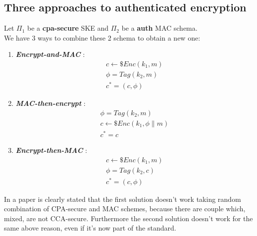 \subsection{Three approaches to authenticated encryption}
Let $\Pi_{1}$ be a \textbf{cpa-secure} SKE and $\Pi_{2}$ be a \textbf{auth} MAC
schema.\\
We have 3 ways to combine these 2 schema to obtain a new one:
\begin{enumerate}
    \item \textbf{ \textit{Encrypt-and-MAC} } :
        \begin{gather*}
            c \leftarrow\$ Enc(k_{1}, m)\\
            \phi = Tag(k_{2}, m)\\
            c^{*}=(c, \phi)
        \end{gather*}
        
    \item  \textbf{ \textit{MAC-then-encrypt} } :
        \begin{gather*}
            \phi = Tag(k_{2}, m)\\
            c \leftarrow\$ Enc(k_{1}, \phi \| m)\\
            c^{*}=c
        \end{gather*}
        
    \item  \textbf{ \textit{Encrypt-then-MAC} } :
        \begin{gather*}
            c \leftarrow\$ Enc(k_{1}, m)\\
            \phi = Tag(k_{2}, c) \\
            c^{*}=(c, \phi)
        \end{gather*}
        
\end{enumerate}
In a paper is clearly stated that the first solution doesn't work taking random
combination of CPA-secure and MAC schemes, because there are couple which,
mixed, are not CCA-secure. Furthermore the second solution doesn't work for the
same above reason, even if it's now part of the standard.\\

